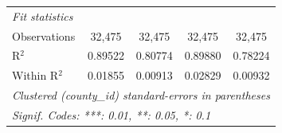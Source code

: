 \begin{tabular}{lcccc}
   \midrule
   \emph{Fit statistics}\\
   Observations                                     & 32,475             & 32,475                    & 32,475               & 32,475\\  
   R$^2$                                            & 0.89522            & 0.80774                   & 0.89880              & 0.78224\\  
   Within R$^2$                                     & 0.01855            & 0.00913                   & 0.02829              & 0.00932\\  
   \midrule \midrule
   \multicolumn{5}{l}{\emph{Clustered (county\_id) standard-errors in parentheses}}\\
   \multicolumn{5}{l}{\emph{Signif. Codes: ***: 0.01, **: 0.05, *: 0.1}}\\
\end{tabular}
\par\endgroup


